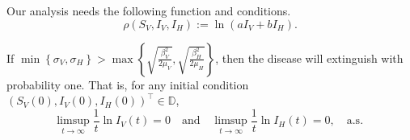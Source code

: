 Our analysis needs the following function and conditions.
\begin{equation}
    \rho (S_V, I_V, I_H) := \ln (a I_V + b I_H) .
\end{equation}

\begin{theorem}
    If 
    $
        \displaystyle
        \min
            \left \{
                  \sigma_V, \sigma_H 
            \right\} 
            > 
        \max 
            \left \{
                \sqrt{
                    \frac{\beta_V ^ 2}{2 \mu_V}
                },
                \sqrt{
                    \frac{\beta_H ^ 2}{2 \mu_H}
                }
            \right \}
    $,
        then the disease will extinguish with probability one.  That is,
        for any initial condition 
        $(S_V(0), I_V(0), I_H(0)) ^{\top} \in \mathbb{D}$,
        $$
            \limsup_{t \to \infty} 
                \frac{1}{t} \ln I_V(t) = 0 
                \quad \text{and} \quad
            \limsup_{t \to \infty} 
                \frac{1}{t} \ln I_H(t) = 0, \quad 
                \text{
                   a.s.
                }
        $$
\end{theorem}        

